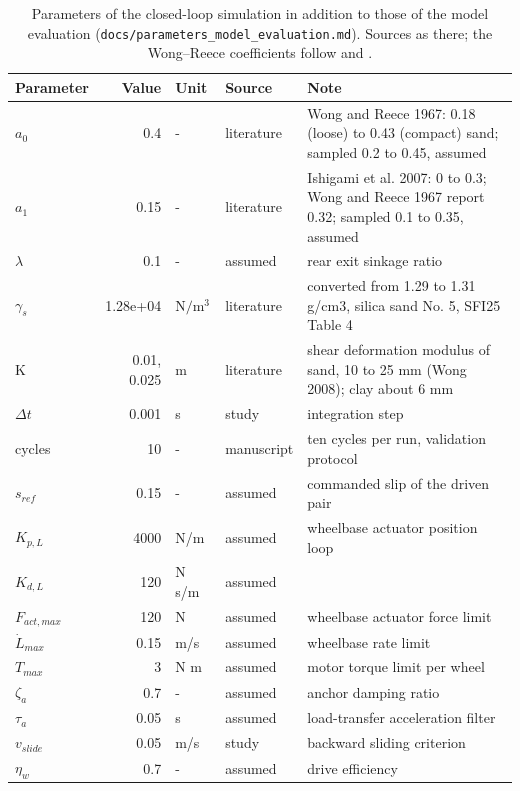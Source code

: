 \begin{table}[!ht]
\centering
\caption{Parameters of the closed-loop simulation in addition to those of the model evaluation (\texttt{docs/parameters\_model\_evaluation.md}). Sources as there; the Wong--Reece coefficients follow \citet{WR67} and \citet{IMN07}.\\}
\label{tab:simparams}
\small
\setlength{\tabcolsep}{4pt}
\begin{tabularx}{\linewidth}{@{}l r l l X@{}}
\toprule
\textbf{Parameter} & \textbf{Value} & \textbf{Unit} & \textbf{Source} & \textbf{Note} \\
\midrule
$a_0$ & 0.4 & - & literature & Wong and Reece 1967: 0.18 (loose) to 0.43 (compact) sand; sampled 0.2 to 0.45, assumed \\
$a_1$ & 0.15 & - & literature & Ishigami et al. 2007: 0 to 0.3; Wong and Reece 1967 report 0.32; sampled 0.1 to 0.35, assumed \\
$\lambda$ & 0.1 & - & assumed & rear exit sinkage ratio \\
$\gamma_s$ & 1.28e+04 & $\mathrm{N/m^3}$ & literature & converted from 1.29 to 1.31 g/cm3, silica sand No. 5, SFI25 Table 4 \\
K & 0.01, 0.025 & m & literature & shear deformation modulus of sand, 10 to 25 mm (Wong 2008); clay about 6 mm \\
$\Delta t$ & 0.001 & s & study & integration step \\
cycles & 10 & - & manuscript & ten cycles per run, validation protocol \\
$s_{ref}$ & 0.15 & - & assumed & commanded slip of the driven pair \\
$K_{p,L}$ & 4000 & N/m & assumed & wheelbase actuator position loop \\
$K_{d,L}$ & 120 & N s/m & assumed &  \\
$F_{act,max}$ & 120 & N & assumed & wheelbase actuator force limit \\
$\dot L_{max}$ & 0.15 & m/s & assumed & wheelbase rate limit \\
$T_{max}$ & 3 & N m & assumed & motor torque limit per wheel \\
$\zeta_a$ & 0.7 & - & assumed & anchor damping ratio \\
$\tau_a$ & 0.05 & s & assumed & load-transfer acceleration filter \\
$v_{slide}$ & 0.05 & m/s & study & backward sliding criterion \\
$\eta_w$ & 0.7 & - & assumed & drive efficiency \\

\end{tabularx}
\end{table}
